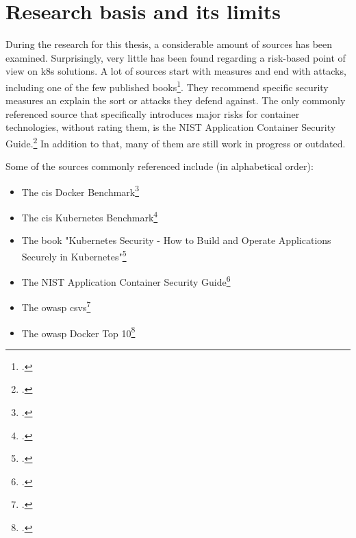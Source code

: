 \section{Research basis and its limits}

During the research for this thesis, a considerable amount of sources has been examined. Surprisingly, very little has been found regarding a risk-based point of view on \gls{k8s} solutions. A lot of sources start with measures and end with attacks, including one of the few published books\footcite{k8sBook}. They recommend specific security measures an explain the sort or attacks they defend against. The only commonly referenced source that specifically introduces major risks for container technologies, without rating them, is the NIST Application Container Security Guide.\footcite{nistK8s}
In addition to that, many of them are still work in progress or outdated.

Some of the sources commonly referenced include (in alphabetical order):
\begin{itemize}

\item The \gls{cis} Docker Benchmark\footcite{cisDocker}

\item The \gls{cis} Kubernetes Benchmark\footcite{cisK8s}

\item The book "Kubernetes Security - How to Build and Operate Applications Securely in Kubernetes"\footcite{k8sBook}

\item The NIST Application Container Security Guide\footcite{nistK8s}

\item The \gls{owasp} \gls{csvs}\footcite{csvsGithub}

\item The \gls{owasp} Docker Top 10\footcite{dockerTop10Github}

\end{itemize}

